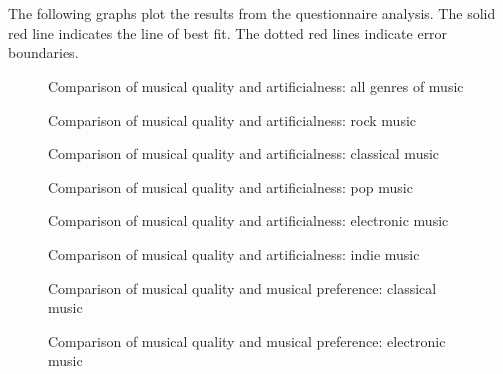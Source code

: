 \documentclass[titlepage]{scrartcl}
\begin{document}
    \section{}\label{ap2}
    The following graphs plot the results from the questionnaire analysis. The
    solid red line indicates the line of best fit. The dotted red lines
    indicate error boundaries.
    \begin{figure}[H]
        \caption{Comparison of musical quality and artificialness: all genres of  music}
    \end{figure}
    \begin{figure}[H]
        \caption{Comparison of musical quality and artificialness: rock music}
    \end{figure}
    \begin{figure}[H]
        \caption{Comparison of musical quality and artificialness: classical music}
    \end{figure}
    \begin{figure}[H]
        \caption{Comparison of musical quality and artificialness: pop music}
    \end{figure}
    \begin{figure}[H]
        \caption{Comparison of musical quality and artificialness: electronic music}
    \end{figure}
    \begin{figure}[H]
        \caption{Comparison of musical quality and artificialness: indie music}
    \end{figure}
    \begin{figure}[H]
        \caption{Comparison of musical quality and musical preference: classical music}
    \end{figure}
    \begin{figure}[H]
        \caption{Comparison of musical quality and musical preference: electronic music}
    \end{figure}
\end{document}
